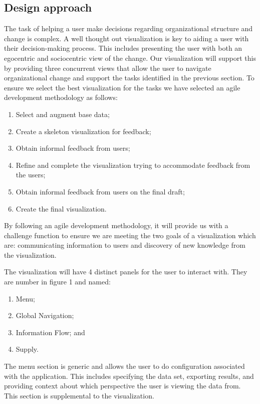 \documentclass{soups}
\begin{document}
\subsection{Design approach}
The task of helping a user make decisions regarding organizational structure and change is complex.  A well thought out visualization is key to aiding a user with their decision-making process.  This includes presenting the user with both an egocentric and sociocentric view of the change.  Our visualization will support this by providing three concurrent views that allow the user to navigate organizational change and support the tasks identified in the previous section.  To ensure we select the best visualization for the tasks we have selected an agile development methodology as follows:
\begin{enumerate}
\item Select and augment base data;
\item Create a skeleton visualization for feedback;
\item Obtain informal feedback from users;
\item Refine and complete the visualization trying to accommodate feedback from the users;
\item Obtain informal feedback from users on the final draft;
\item Create the final visualization.
\end{enumerate}

By following an agile development methodology, it will provide us with a challenge function to ensure we are meeting the two goals of a visualization which are: communicating information to users and discovery of new knowledge from the visualization. 

The visualization will have 4 distinct panels for the user to interact with.  They are number in figure 1 and named:
\begin{enumerate}
\item Menu;
\item Global Navigation;
\item Information Flow; and
\item Supply.
\end{enumerate}

The menu section is generic and allows the user to do configuration associated with the application.  This includes specifying the data set, exporting results, and providing context about which perspective the user is viewing the data from.  This section is supplemental to the visualization.
\end{document}
